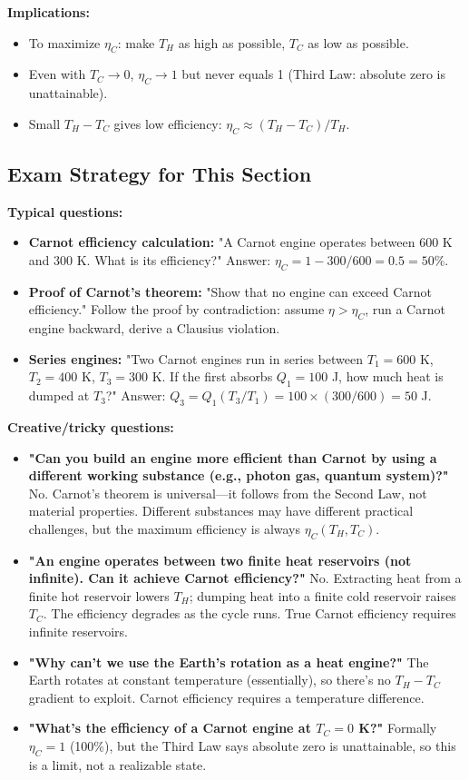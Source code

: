 \documentclass[9pt,twocoloumn]{article}
\begin{document}
\textbf{Implications:}
\begin{itemize}
    \item To maximize $\eta_C$: make $T_H$ as high as possible, $T_C$ as low as possible.
    \item Even with $T_C \to 0$, $\eta_C \to 1$ but never equals 1 (Third Law: absolute zero is unattainable).
    \item Small $T_H - T_C$ gives low efficiency: $\eta_C \approx (T_H - T_C)/T_H$.
\end{itemize}

\subsection{Exam Strategy for This Section}

\textbf{Typical questions:}
\begin{itemize}
    \item \textbf{Carnot efficiency calculation:} "A Carnot engine operates between 600 K and 300 K. What is its efficiency?" Answer: $\eta_C = 1 - 300/600 = 0.5 = 50\%$.
    \item \textbf{Proof of Carnot's theorem:} "Show that no engine can exceed Carnot efficiency." Follow the proof by contradiction: assume $\eta > \eta_C$, run a Carnot engine backward, derive a Clausius violation.
    \item \textbf{Series engines:} "Two Carnot engines run in series between $T_1 = 600$ K, $T_2 = 400$ K, $T_3 = 300$ K. If the first absorbs $Q_1 = 100$ J, how much heat is dumped at $T_3$?" Answer: $Q_3 = Q_1 (T_3/T_1) = 100 \times (300/600) = 50$ J.
\end{itemize}

\textbf{Creative/tricky questions:}
\begin{itemize}
    \item \textbf{"Can you build an engine more efficient than Carnot by using a different working substance (e.g., photon gas, quantum system)?"} No. Carnot's theorem is universal—it follows from the Second Law, not material properties. Different substances may have different practical challenges, but the maximum efficiency is always $\eta_C(T_H, T_C)$.
    \item \textbf{"An engine operates between two finite heat reservoirs (not infinite). Can it achieve Carnot efficiency?"} No. Extracting heat from a finite hot reservoir lowers $T_H$; dumping heat into a finite cold reservoir raises $T_C$. The efficiency degrades as the cycle runs. True Carnot efficiency requires infinite reservoirs.
    \item \textbf{"Why can't we use the Earth's rotation as a heat engine?"} The Earth rotates at constant temperature (essentially), so there's no $T_H - T_C$ gradient to exploit. Carnot efficiency requires a temperature difference.
    \item \textbf{"What's the efficiency of a Carnot engine at $T_C = 0$ K?"} Formally $\eta_C = 1$ (100\%), but the Third Law says absolute zero is unattainable, so this is a limit, not a realizable state.
\end{itemize}
\end{document}
